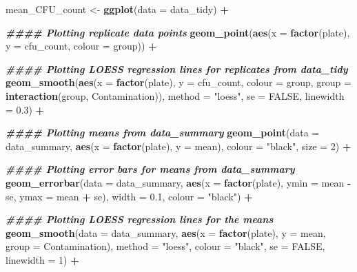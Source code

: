 \documentclass[
]{article}
\newenvironment{Shaded}{\begin{snugshade}}{\end{snugshade}}
\newcommand{\AttributeTok}[1]{\textcolor[rgb]{0.13,0.29,0.53}{#1}}
\newcommand{\ConstantTok}[1]{\textcolor[rgb]{0.56,0.35,0.01}{#1}}
\newcommand{\DecValTok}[1]{\textcolor[rgb]{0.00,0.00,0.81}{#1}}
\newcommand{\DocumentationTok}[1]{\textcolor[rgb]{0.56,0.35,0.01}{\textbf{\textit{#1}}}}
\newcommand{\FloatTok}[1]{\textcolor[rgb]{0.00,0.00,0.81}{#1}}
\newcommand{\FunctionTok}[1]{\textcolor[rgb]{0.13,0.29,0.53}{\textbf{#1}}}
\newcommand{\NormalTok}[1]{#1}
\newcommand{\OtherTok}[1]{\textcolor[rgb]{0.56,0.35,0.01}{#1}}
\newcommand{\SpecialCharTok}[1]{\textcolor[rgb]{0.81,0.36,0.00}{\textbf{#1}}}
\newcommand{\StringTok}[1]{\textcolor[rgb]{0.31,0.60,0.02}{#1}}
\begin{document}
\begin{Shaded}
\begin{Highlighting}[]
\NormalTok{mean\_CFU\_count }\OtherTok{\textless{}{-}} \FunctionTok{ggplot}\NormalTok{(}\AttributeTok{data =}\NormalTok{ data\_tidy) }\SpecialCharTok{+}
  
  \DocumentationTok{\#\#\#\# Plotting replicate data points}
  \FunctionTok{geom\_point}\NormalTok{(}\FunctionTok{aes}\NormalTok{(}\AttributeTok{x =} \FunctionTok{factor}\NormalTok{(plate), }
                 \AttributeTok{y =}\NormalTok{ cfu\_count, }
                 \AttributeTok{colour =}\NormalTok{ group)) }\SpecialCharTok{+}
  
  \DocumentationTok{\#\#\#\# Plotting LOESS regression lines for replicates from data\_tidy}
  \FunctionTok{geom\_smooth}\NormalTok{(}\FunctionTok{aes}\NormalTok{(}\AttributeTok{x =} \FunctionTok{factor}\NormalTok{(plate), }
                  \AttributeTok{y =}\NormalTok{ cfu\_count, }
                  \AttributeTok{colour =}\NormalTok{ group,}
                  \AttributeTok{group =} \FunctionTok{interaction}\NormalTok{(group, Contamination)), }
              \AttributeTok{method =} \StringTok{"loess"}\NormalTok{, }
              \AttributeTok{se =} \ConstantTok{FALSE}\NormalTok{,}
              \AttributeTok{linewidth =} \FloatTok{0.3}\NormalTok{) }\SpecialCharTok{+}
  
  \DocumentationTok{\#\#\#\# Plotting means from data\_summary}
  \FunctionTok{geom\_point}\NormalTok{(}\AttributeTok{data =}\NormalTok{ data\_summary, }
             \FunctionTok{aes}\NormalTok{(}\AttributeTok{x =} \FunctionTok{factor}\NormalTok{(plate), }
                 \AttributeTok{y =}\NormalTok{ mean), }
             \AttributeTok{colour =} \StringTok{"black"}\NormalTok{, }
             \AttributeTok{size =} \DecValTok{2}\NormalTok{) }\SpecialCharTok{+}
  
  \DocumentationTok{\#\#\#\# Plotting error bars for means from data\_summary}
  \FunctionTok{geom\_errorbar}\NormalTok{(}\AttributeTok{data =}\NormalTok{ data\_summary,}
                \FunctionTok{aes}\NormalTok{(}\AttributeTok{x =} \FunctionTok{factor}\NormalTok{(plate), }
                    \AttributeTok{ymin =}\NormalTok{ mean }\SpecialCharTok{{-}}\NormalTok{ se, }
                    \AttributeTok{ymax =}\NormalTok{ mean }\SpecialCharTok{+}\NormalTok{ se), }
                \AttributeTok{width =} \FloatTok{0.1}\NormalTok{, }
                \AttributeTok{colour =} \StringTok{"black"}\NormalTok{) }\SpecialCharTok{+}
  
  \DocumentationTok{\#\#\#\# Plotting LOESS regression lines for the means}
  \FunctionTok{geom\_smooth}\NormalTok{(}\AttributeTok{data =}\NormalTok{ data\_summary,}
              \FunctionTok{aes}\NormalTok{(}\AttributeTok{x =} \FunctionTok{factor}\NormalTok{(plate), }
                  \AttributeTok{y =}\NormalTok{ mean,}
                  \AttributeTok{group =}\NormalTok{ Contamination), }
              \AttributeTok{method =} \StringTok{"loess"}\NormalTok{, }
              \AttributeTok{colour =} \StringTok{"black"}\NormalTok{,}
              \AttributeTok{se =} \ConstantTok{FALSE}\NormalTok{, }
              \AttributeTok{linewidth =} \DecValTok{1}\NormalTok{) }\SpecialCharTok{+}
  

\end{Highlighting}
\end{Shaded}
\end{document}
